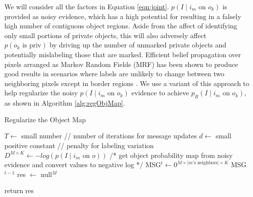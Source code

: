 \documentclass[11pt]{article}
\begin{document}
We will consider all the factors in Equation \ref{eqn:joint}.  $p(I \mid i_m \textrm{ on } o_k)$ is provided as noisy evidence, which has a high potential for resulting in a falsely high number of contiguous object regions.  Aside from the affect of identifying only small portions of private objects, this will also adversely affect $p(o_k \textrm{ is priv})$ by driving up the number of unmarked private objects and potentially mislabeling those that are marked.  Efficient belief propagation over pixels arranged as Markov Random Fields (MRF) has been shown to produce good results in scenarios where labels are unlikely to change between two neighboring pixels except in border regions \cite{felzenszwalb2006efficient}.  We use a variant of this approach to help regularize the noisy $p(I \mid i_m \textrm{ on } o_k)$ evidence to achieve $p_R(I \mid i_m \textrm{ on } o_k)$, as shown in Algorithm \ref{alg:regObjMap}.


\begin{algorithm}[h!]\label{alg:regObjMap}
\caption{Regularize the Object Map}

$T \leftarrow$ small number // number of iterations for message updates\;
$d \leftarrow$ small positive constant // penalty for labeling variation\;
$D^{M \times K} \leftarrow -log(p(I \mid i_m \textrm{ on } o))$ /* get object probability map from noisy evidence and convert values to negative log */\;
MSG$^t \leftarrow 0^{M \times \lvert m\textrm{'s neighbors} \rvert \times K}$\;
MSG$^{t-1}$\;
res $\leftarrow$ null$^M$\;



return res\;
\end{algorithm}
\end{document}
